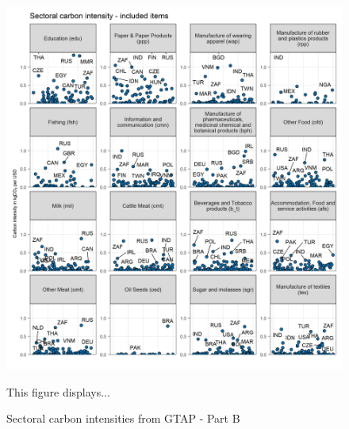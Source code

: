 \documentclass[12pt, a4paper]{article}
\newenvironment{subcaption}
{\strut
\vspace{-5pt}
\begin{minipage}[b]{0.9\textwidth}
  \hspace*{-\parindent}
  \footnotesize}
 {\end{minipage}}
\begin{document}
\clearpage

\begin{figure}[ht!]
  \centering
  \caption{Sectoral carbon intensities from GTAP - Part B} \label{fig:B2}
  \includegraphics{Analysis_Carbon_Intensities_GTAP/Figure_2.1.1_B_2017}
  \begin{subcaption}
    This figure displays...
  \end{subcaption}

\end{figure}

\clearpage
\end{document}
